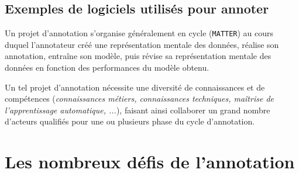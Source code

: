 		
		\subsection{Exemples de logiciels utilisés pour annoter}
		\label{section:2.2.3-ORGANISATION-ANNOTATION-LOGICIELS}
		
		
		\begin{leftBarSummary}
			\begin{todolist}
				\item[\itemok] Un projet d'annotation s'organise généralement en cycle (\texttt{MATTER}) au cours duquel l'annotateur créé une représentation mentale des données, réalise son annotation, entraîne son modèle, puis révise sa représentation mentale des données en fonction des performances du modèle obtenu.
				\item[\itemok] Un tel projet d'annotation nécessite une diversité de connaissances et de compétences (\textit{connaissances métiers, connaissances techniques, maîtrise de l'apprentissage automatique, ...}), faisant ainsi collaborer un grand nombre d'acteurs qualifiés pour une ou plusieurs phase du cycle d'annotation.
			\end{todolist}
		\end{leftBarSummary}
	
	
    \section{Les nombreux défis de l'annotation}
	\label{section:2.3-DEFIS-ANNOTATION}
		
